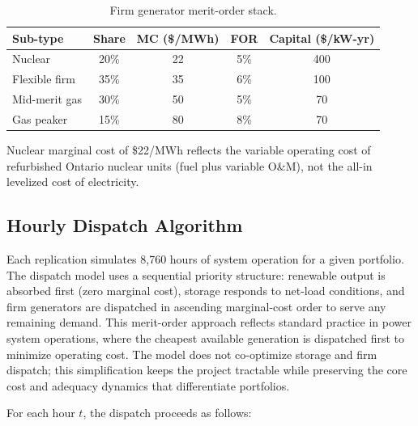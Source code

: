 \documentclass[11pt]{article}
\begin{document}
\begin{table}[h]
\centering
\caption{Firm generator merit-order stack.}\label{tab:merit}
\begin{tabular}{lcccc}
\toprule
Sub-type & Share & MC (\$/MWh) & FOR & Capital (\$/kW-yr) \\
\midrule
Nuclear       & 20\% & 22 & 5\% & 400 \\
Flexible firm & 35\% & 35 & 6\% & 100 \\
Mid-merit gas & 30\% & 50 & 5\% & 70 \\
Gas peaker    & 15\% & 80 & 8\% & 70 \\
\bottomrule
\end{tabular}
\end{table}

Nuclear marginal cost of \$22/MWh reflects the variable operating cost of refurbished Ontario nuclear units (fuel plus variable O\&M), not the all-in levelized cost of electricity.

\subsection{Hourly Dispatch Algorithm}

Each replication simulates 8,760 hours of system operation for a given portfolio. The dispatch model uses a sequential priority structure: renewable output is absorbed first (zero marginal cost), storage responds to net-load conditions, and firm generators are dispatched in ascending marginal-cost order to serve any remaining demand. This merit-order approach reflects standard practice in power system operations, where the cheapest available generation is dispatched first to minimize operating cost. The model does not co-optimize storage and firm dispatch; this simplification keeps the project tractable while preserving the core cost and adequacy dynamics that differentiate portfolios.

For each hour $t$, the dispatch proceeds as follows:
\end{document}
